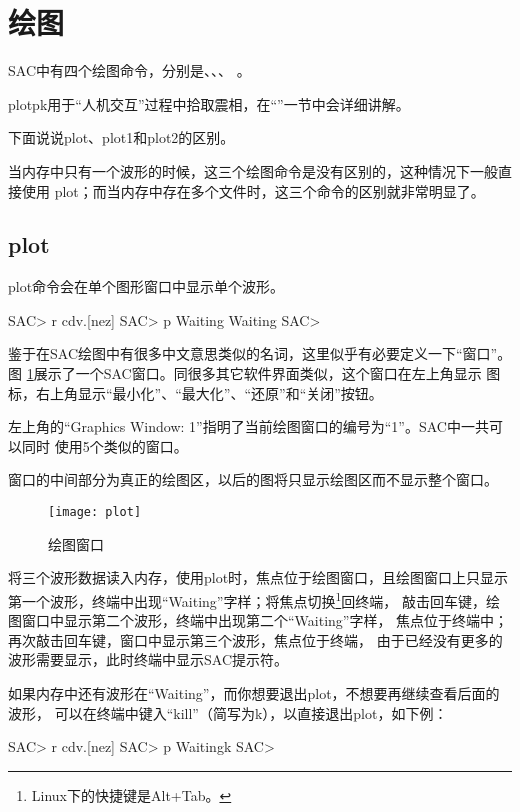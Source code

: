 \section{绘图}
\label{sec:display}

SAC中有四个绘图命令，分别是、、、
。

plotpk用于``人机交互''过程中拾取震相，在``''一节中会详细讲解。

下面说说plot、plot1和plot2的区别。

当内存中只有一个波形的时候，这三个绘图命令是没有区别的，这种情况下一般直接使用
plot；而当内存中存在多个文件时，这三个命令的区别就非常明显了。

\subsection{plot}
plot命令会在单个图形窗口中显示单个波形。
\begin{SACCode}
SAC> r cdv.[nez]
SAC> p
Waiting
Waiting
SAC>
\end{SACCode}

鉴于在SAC绘图中有很多中文意思类似的名词，这里似乎有必要定义一下``窗口''。图
\ref{fig:plot}展示了一个SAC窗口。同很多其它软件界面类似，这个窗口在左上角显示
图标，右上角显示``最小化''、``最大化''、``还原''和``关闭''按钮。

左上角的``Graphics Window: 1''指明了当前绘图窗口的编号为``1''。SAC中一共可以同时
使用5个类似的窗口。

窗口的中间部分为真正的绘图区，以后的图将只显示绘图区而不显示整个窗口。

\begin{figure}[H]
\centering
\texttt{[image: plot]}
\caption{绘图窗口}
\label{fig:plot}
\end{figure}

将三个波形数据读入内存，使用plot时，焦点位于绘图窗口，且绘图窗口上只显示
第一个波形，终端中出现``Waiting''字样；将焦点切换\footnote{Linux下的快捷键是Alt+Tab。}回终端，
敲击回车键，绘图窗口中显示第二个波形，终端中出现第二个``Waiting''字样，
焦点位于终端中；再次敲击回车键，窗口中显示第三个波形，焦点位于终端，
由于已经没有更多的波形需要显示，此时终端中显示SAC提示符。

如果内存中还有波形在``Waiting''，而你想要退出plot，不想要再继续查看后面的波形，
可以在终端中键入``kill''（简写为k），以直接退出plot，如下例：
\begin{SACCode}
SAC> r cdv.[nez]
SAC> p
Waitingk
SAC>
\end{SACCode}

